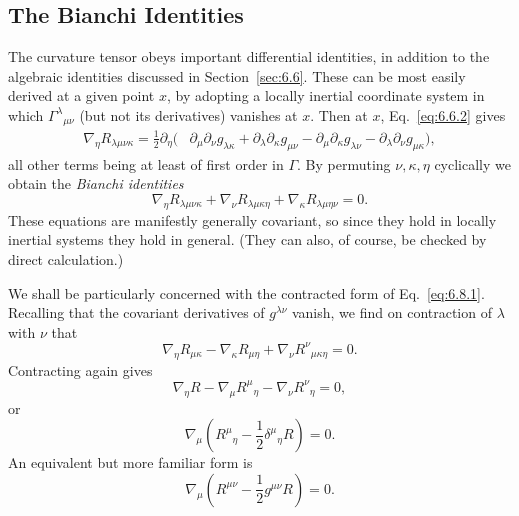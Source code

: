 
\subsection{The Bianchi Identities}\label{sec:6.8}

The curvature tensor obeys important differential identities, in addition to
the algebraic identities discussed in Section~\ref{sec:6.6}. These can be
most easily derived at a given point \(x\), by adopting a locally inertial
coordinate system in which \(\Gamma^\lambda{}_{\mu\nu}\) (but not its
derivatives) vanishes at \(x\). Then at \(x\), Eq.~\eqref{eq:6.6.2} gives
\begin{align*}
  \nabla_\eta R_{\lambda\mu\nu\kappa}
  =\frac12\partial_\eta\bigl(
    &\partial_\mu\partial_\nu g_{\lambda\kappa}
    +\partial_\lambda\partial_\kappa g_{\mu\nu}
    -\partial_\mu\partial_\kappa g_{\lambda\nu}
    -\partial_\lambda\partial_\nu g_{\mu\kappa}
  \bigr),
\end{align*}
all other terms being at least of first order in \(\Gamma\). By permuting
\(\nu,\kappa,\eta\) cyclically we obtain the \emph{Bianchi identities}
\begin{equation}
  \nabla_\eta R_{\lambda\mu\nu\kappa}
  +\nabla_\nu R_{\lambda\mu\kappa\eta}
  +\nabla_\kappa R_{\lambda\mu\eta\nu}
  =0.
  \tag{6.8.1}\label{eq:6.8.1}
\end{equation}
These equations are manifestly generally covariant, so since they hold in
locally inertial systems they hold in general. (They can also, of course, be
checked by direct calculation.)

We shall be particularly concerned with the contracted form of
Eq.~\eqref{eq:6.8.1}. Recalling that the covariant derivatives of
\(g^{\lambda\nu}\) vanish, we find on contraction of \(\lambda\) with
\(\nu\) that
\begin{equation}
  \nabla_\eta R_{\mu\kappa}
  -\nabla_\kappa R_{\mu\eta}
  +\nabla_\nu R^\nu{}_{\mu\kappa\eta}
  =0.
  \tag{6.8.2}\label{eq:6.8.2}
\end{equation}
Contracting again gives
\[
  \nabla_\eta R
  -\nabla_\mu R^\mu{}_\eta
  -\nabla_\nu R^\nu{}_\eta
  =0,
\]
or
\begin{equation}
  \nabla_\mu
  \left(
    R^\mu{}_\eta-\frac12\delta^\mu{}_\eta R
  \right)
  =0.
  \tag{6.8.3}\label{eq:6.8.3}
\end{equation}
An equivalent but more familiar form is
\begin{equation}
  \nabla_\mu
  \left(
    R^{\mu\nu}-\frac12g^{\mu\nu}R
  \right)
  =0.
  \tag{6.8.4}\label{eq:6.8.4}
\end{equation}
